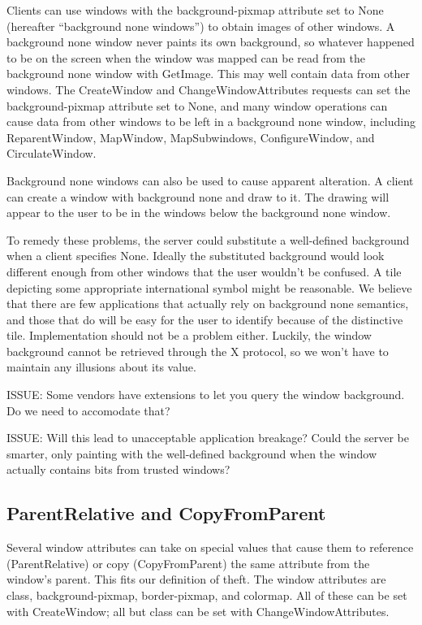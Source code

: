 Clients can use windows with the background-pixmap attribute set to
None (hereafter ``background none windows'') to obtain images of other
windows.  A background none window never paints its own background, so
whatever happened to be on the screen when the window was mapped can
be read from the background none window with GetImage.  This may well
contain data from other windows.  The CreateWindow and
ChangeWindowAttributes requests can set the background-pixmap
attribute set to None, and many window operations can cause data from
other windows to be left in a background none window, including
ReparentWindow, MapWindow, MapSubwindows, ConfigureWindow, and
CirculateWindow.

Background none windows can also be used to cause apparent alteration.
A client can create a window with background none and draw to it.  The
drawing will appear to the user to be in the windows below the
background none window.

To remedy these problems, the server could substitute a well-defined
background when a client specifies None.  Ideally the substituted
background would look different enough from other windows that the
user wouldn't be confused.  A tile depicting some appropriate
international symbol might be reasonable.  We believe that there are
few applications that actually rely on background none semantics, and
those that do will be easy for the user to identify because of the
distinctive tile.  Implementation should not be a problem either.
Luckily, the window background cannot be retrieved through the X
protocol, so we won't have to maintain any illusions about its value.

ISSUE: Some vendors have extensions to let you query the window
background.  Do we need to accomodate that?

ISSUE: Will this lead to unacceptable application breakage?  Could the
server be smarter, only painting with the well-defined background when
the window actually contains bits from trusted windows?

\subsection{ParentRelative and CopyFromParent}

Several window attributes can take on special values that cause them
to reference (ParentRelative) or copy (CopyFromParent) the same
attribute from the window's parent.  This fits our definition of theft.
The window attributes are class, background-pixmap, border-pixmap, and
colormap.  All of these can be set with CreateWindow; all but class
can be set with ChangeWindowAttributes.

